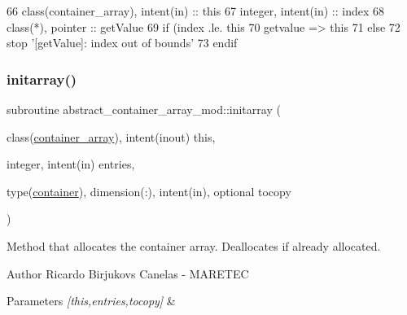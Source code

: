 \begin{DoxyCode}
66     \textcolor{keywordtype}{class}(container\_array), \textcolor{keywordtype}{intent(in)} :: this
67     \textcolor{keywordtype}{integer}, \textcolor{keywordtype}{intent(in)} :: index
68     \textcolor{keywordtype}{class}(*), \textcolor{keywordtype}{pointer} :: getValue
69     \textcolor{keywordflow}{if} (index .le. this%
70         getvalue => this%
71     \textcolor{keywordflow}{else}
72         stop \textcolor{stringliteral}{'[getValue]: index out of bounds'}
73 \textcolor{keywordflow}{    endif}
\end{DoxyCode}
\mbox{\label{namespaceabstract__container__array__mod_a6a8e7af177f333262aba941775d6c245}} 
\subsubsection{\texorpdfstring{initarray()}{initarray()}}
{\footnotesize\ttfamily subroutine abstract\+\_\+container\+\_\+array\+\_\+mod\+::initarray (\begin{DoxyParamCaption}\item[{class(\mbox{\hyperlink{structabstract__container__array__mod_1_1container__array}{container\+\_\+array}}), intent(inout)}]{this,  }\item[{integer, intent(in)}]{entries,  }\item[{type(\mbox{\hyperlink{structcontainer__mod_1_1container}{container}}), dimension(\+:), intent(in), optional}]{tocopy }\end{DoxyParamCaption})\hspace{0.3cm}{\ttfamily [private]}}



Method that allocates the container array. Deallocates if already allocated. 

\begin{DoxyAuthor}{Author}
Ricardo Birjukovs Canelas -\/ M\+A\+R\+E\+T\+EC 
\end{DoxyAuthor}

\begin{DoxyParams}{Parameters}
{\em \mbox{[}this,entries,tocopy\mbox{]}} & \\
\hline
\end{DoxyParams}


